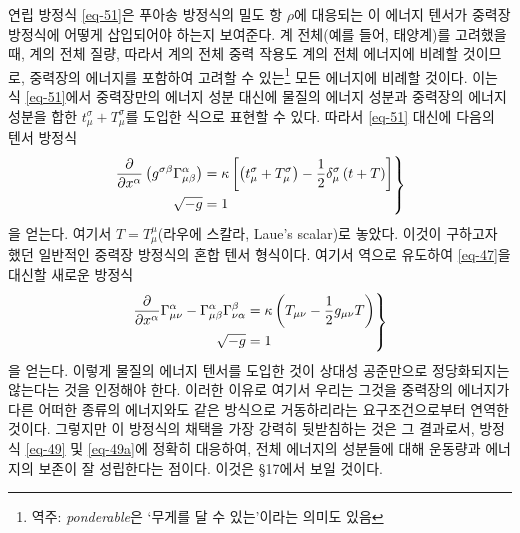 \documentclass[b5paper]{article}
\begin{document}
연립 방정식 \eqref{eq-51}은 푸아송 방정식의 밀도 항 $\rho$에 대응되는 이 에너지 텐서가 중력장 방정식에 어떻게 삽입되어야 하는지 보여준다.
계 전체(예를 들어, 태양계)를 고려했을 때, 계의 전체 질량, 따라서 계의 전체 중력 작용도 계의 전체 에너지에 비례할 것이므로, 중력장의 에너지를 포함하여 고려할 수 있는\footnote{역주: \emph{ponderable}은 `무게를 달 수 있는'이라는 의미도 있음} 모든 에너지에 비례할 것이다. 이는 식 \eqref{eq-51}에서 중력장만의 에너지 성분 대신에 물질의 에너지 성분과 중력장의 에너지 성분을 합한 $t_\mu^\sigma+T_\mu^\sigma$를 도입한 식으로 표현할 수 있다. 따라서 \eqref{eq-51} 대신에 다음의 텐서 방정식
\begin{equation} \label{eq-52}
\left.
	\begin{aligned}
	{\frac{{\partial}{}}{{\partial}{x^\alpha}}} \left( g^{\sigma\beta} \Gamma_{\mu\beta}^{\alpha} \right)
	&= \kappa\left[\left( t_\mu^\sigma+T_\mu^\sigma \right) - \frac{1}{2} \delta_\mu^\sigma \left(t+T\right)\right]\\
	\sqrt{-g} &= 1
	\end{aligned}
\right\}
\end{equation}
을 얻는다. 여기서 $T=T_\mu^\mu$(라우에 스칼라, Laue's scalar)로 놓았다. 이것이 구하고자 했던 일반적인 중력장 방정식의 혼합 텐서 형식이다. 여기서 역으로 유도하여 \eqref{eq-47}을 대신할 새로운 방정식
\begin{equation} \label{eq-53}
\left.
\begin{aligned}
{\frac{{\partial}{}}{{\partial}{x^\alpha}}}\Gamma_{\mu\nu}^{\alpha}
- \Gamma_{\mu\beta}^{\alpha}\Gamma_{\nu\alpha}^{\beta}
&= \kappa\left( T_{\mu\nu} - \frac{1}{2} g_{\mu\nu}T \right)\\
\sqrt{-g}&=1
\end{aligned} \right\}
\end{equation}
을 얻는다. 이렇게 물질의 에너지 텐서를 도입한 것이 상대성 공준만으로 정당화되지는 않는다는 것을 인정해야 한다. 이러한 이유로 여기서 우리는 그것을 중력장의 에너지가 다른 어떠한 종류의 에너지와도 같은 방식으로 거동하리라는 요구조건으로부터 연역한 것이다. 그렇지만 이 방정식의 채택을 가장 강력히 뒷받침하는 것은 그 결과로서, 방정식 \eqref{eq-49} 및 \eqref{eq-49a}에 정확히 대응하여, 전체 에너지의 성분들에 대해 운동량과 에너지의 보존이 잘 성립한다는 점이다. 이것은 \S 17에서 보일 것이다.
\end{document}
